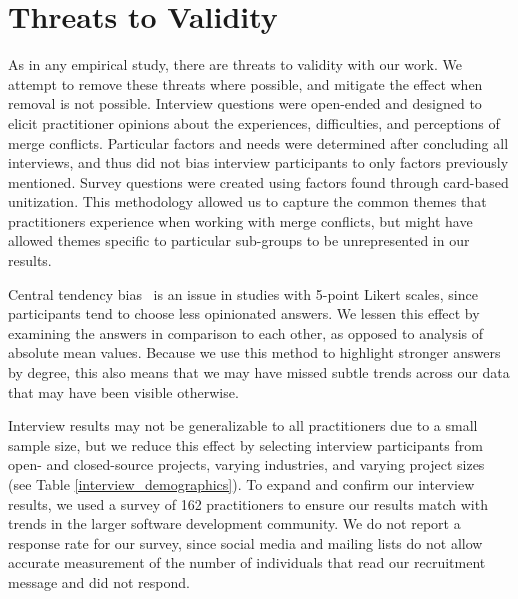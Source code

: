 \section{Threats to Validity}\label{threats}
As in any empirical study, there are threats to validity with our work.
We attempt to remove these threats where possible, and mitigate the effect when removal is not possible.
Interview questions were open-ended and designed to elicit practitioner opinions about the experiences, difficulties, and perceptions of merge conflicts.
Particular factors and needs were determined after concluding all interviews, and thus did not bias interview participants to only factors previously mentioned.
Survey questions were created using factors found through card-based unitization.
This methodology allowed us to capture the common themes that practitioners experience when working with merge conflicts, but might have allowed themes specific to particular sub-groups to be unrepresented in our results.

Central tendency bias~\cite{guilford1954psychometric} is an issue in studies with 5-point Likert scales, since participants tend to choose less opinionated answers.
We lessen this effect by examining the answers in comparison to each other, as opposed to analysis of absolute mean values.
Because we use this method to highlight stronger answers by degree, this also means that we may have missed subtle trends across our data that may have been visible otherwise.

Interview results may not be generalizable to all practitioners due to a small sample size, but we reduce this effect by selecting interview participants from open- and closed-source projects, varying industries, and varying project sizes (see Table \ref{interview_demographics}).
To expand and confirm our interview results, we used a survey of 162 practitioners to ensure our results match with trends in the larger software development community.
We do not report a response rate for our survey, since social media and mailing lists do not allow accurate measurement of the number of individuals that read our recruitment message and did not respond.




